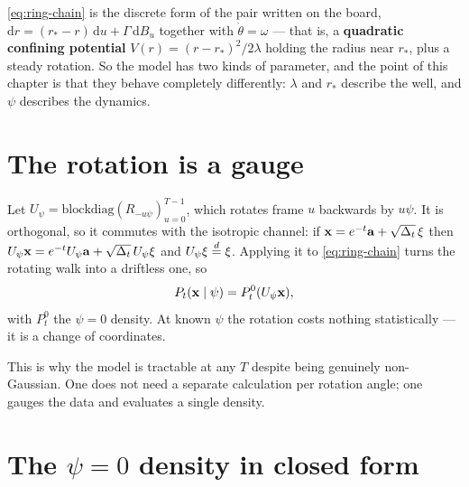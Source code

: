 \eqref{eq:ring-chain} is the discrete form of the pair written on the board,
$\mathrm{d}r = (r_* - r)\,\mathrm{d}u + \Gamma\,\mathrm{d}B_u$ together with
$\dot\theta = \omega$ --- that is, a \textbf{quadratic confining potential}
$V(r) = (r-r_*)^2/2\lambda$ holding the radius near $r_*$, plus a steady rotation. So the model
has two kinds of parameter, and the point of this chapter is that they behave completely
differently: $\lambda$ and $r_*$ describe the well, and $\psi$ describes the dynamics.

\section{The rotation is a gauge}
\label{sec:ring-gauge}

Let $U_\psi = \mathrm{blockdiag}(R_{-u\psi})_{u=0}^{T-1}$, which rotates frame $u$ backwards by
$u\psi$. It is orthogonal, so it commutes with the isotropic channel: if
$\mathbf{x} = e^{-t}\mathbf{a} + \sqrt{\Delta_t}\,\mathbf{\xi}$ then $U_\psi\mathbf{x} = e^{-t}U_\psi\mathbf{a} +
\sqrt{\Delta_t}\,U_\psi\mathbf{\xi}$ and $U_\psi\mathbf{\xi} \overset{d}{=} \mathbf{\xi}$. Applying it to
\eqref{eq:ring-chain} turns the rotating walk into a driftless one, so
\begin{equation}
\label{eq:ring-gauge}
P_t(\mathbf{x} \mid \psi) = P_t^{0}(U_\psi \mathbf{x}),
\end{equation}
with $P_t^0$ the $\psi=0$ density. At known $\psi$ the rotation costs nothing statistically ---
it is a change of coordinates.

\begin{intuition}
This is why the model is tractable at any $T$ despite being genuinely non-Gaussian. One does not
need a separate calculation per rotation angle; one gauges the data and evaluates a single
density.
\end{intuition}

\section{The \texorpdfstring{$\psi=0$}{psi=0} density in closed form}

